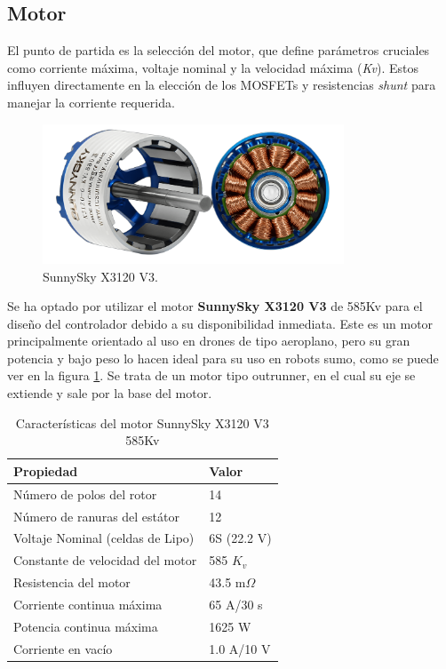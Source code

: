 \documentclass[11pt]{report}
\begin{document}
\newpage
\subsection{Motor}

El punto de partida es la selección del motor, que define parámetros cruciales como corriente máxima, voltaje nominal y la velocidad máxima (\emph{Kv}). Estos influyen directamente en la elección de los MOSFETs y resistencias \emph{shunt} para manejar la corriente requerida.

\begin{figure}[ht]
	\centering
	\includegraphics[width=0.8\textwidth]{imagenes/Motor/X3120.png}
	\caption{SunnySky X3120 V3.}
	\label{X3120}
\end{figure}
\FloatBarrier
Se ha optado por utilizar el motor \textbf{SunnySky X3120 V3} de 585Kv para el diseño del controlador debido a su disponibilidad inmediata. Este es un motor principalmente orientado al uso en drones de tipo aeroplano, pero su gran potencia y bajo peso lo hacen ideal para su uso en robots sumo, como se puede ver en la figura \ref{X3120}. Se trata de un motor tipo outrunner, en el cual su eje se extiende y sale por la base del motor.

\begin{table}[h!]
	\centering
	\caption{Características del motor SunnySky X3120 V3 585Kv}
	\begin{tabular}{l l}
		\hline
		\textbf{Propiedad}               & \textbf{Valor} \\
		\hline
		Número de polos del rotor        & 14             \\
		Número de ranuras del estátor    & 12             \\
		Voltaje Nominal (celdas de Lipo) & 6S (22.2 V)    \\
		Constante de velocidad del motor & 585 $K_v$      \\
		Resistencia del motor            & 43.5 m$\Omega$ \\
		Corriente continua máxima        & 65 A/30 s      \\
		Potencia continua máxima         & 1625 W         \\
		Corriente en vacío               & 1.0 A/10 V     \\
		\hline
	\end{tabular}
\end{table}
\FloatBarrier
\end{document}
